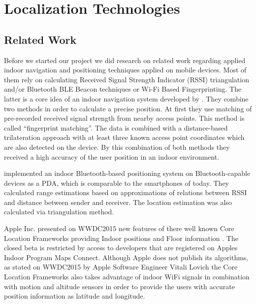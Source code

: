 \chapter{Localization Technologies}
\label{cha:relatedwork}


\section{Related Work}

Before we started our project we did research on related work regarding applied indoor navigation and positioning techniques applied on mobile devices. Most of them rely on calculating Received Signal Strength Indicator (RSSI) triangulation and/or Bluetooth BLE Beacon techniques or Wi-Fi Based Fingerprinting. The latter is a core idea of an indoor navigation system developed by \cite{ChaSo2012}. They combine two methods in order to calculate a precise position. At first they use matching of pre-recorded received signal strength from nearby access points. This method is called \enquote{fingerprint matching}. The data is combined with a distance-based trilateration approach with at least three known access point coordinates which are also detected on the device. By this combination of both methods they received a high accuracy of the user position in an indoor environment.

\cite{FelKyaZap2012} implemented an indoor Bluetooth-based positioning system on Bluetooth-capable devices as a PDA, which is comparable to the smartphones of today. They calculated range estimations based on approximations of relations between RSSI and distance between sender and receiver. The location estimation was also calculated via triangulation method.

Apple Inc. presented on WWDC2015 new features of there well known Core Location Frameworks providing Indoor positions and Floor information \cite{wwdc15}. The closed beta is restricted by access to developers that are registered on Apples Indoor Program Maps Connect. Although Apple does not publish its algorithms, as stated on WWDC2015 by Apple Software Engineer Vitali Lovich the Core Location Frameworks also takes advantage of indoor WiFi signals in combination with motion and altitude sensors in order to provide the users with accurate position information as latitude and longitude.

